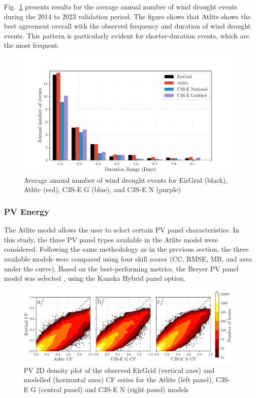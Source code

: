 \documentclass[a4paper, 11pt]{article}
\begin{document}
Fig.~\ref{fig:bar_number_events_verification_wind} presents results for the average annual number of wind drought events during the 2014 to 2023 validation period. The figure shows that Atlite shows the best agreement overall with the observed frequency and duration of wind drought events. This pattern is particularly evident for shorter-duration events, which are the most frequent.

\begin{figure}[!ht]
	\centering
	\includegraphics[width=\textwidth]{verification_wind_bar}
	\caption{Average annual number of wind drought events for EirGrid (black), Atlite (red), C3S-E G (blue), and C3S-E N (purple)}
	\label{fig:bar_number_events_verification_wind}
\end{figure}

\newpage
\subsubsection{PV Energy}
\label{sec:pv_verification}

The Atlite model allows the user to select certain PV panel characteristics. In this study, the three PV panel types available in the Atlite model were considered. Following the same methodology as in the previous section, the three available models were compared using four skill scores (CC, RMSE, MB, and area under the curve). Based on the best-performing metrics, the Breyer PV panel model was selected \cite{beyer2004pv}, using the Kaneka Hybrid panel option.

\begin{figure}[h!]
	\centering
	\includegraphics[width=\textwidth]{verification_pv_contour}
	\caption{PV 2D density plot of the observed EirGrid (vertical axes) and modelled (horizontal axes) CF series for the Atlite  (left panel), C3S-E G (central panel) and C3S-E N (right panel) models}	
	\label{fig:solar_verification_contour}
\end{figure}
\end{document}
